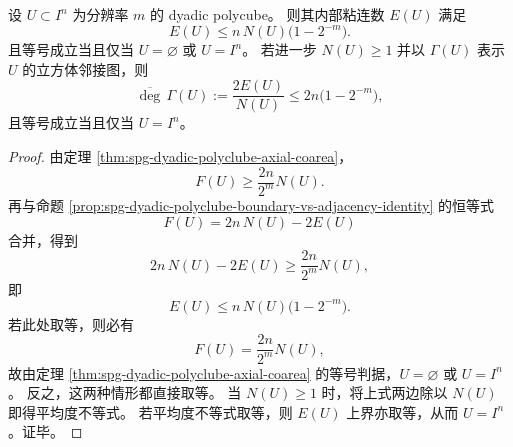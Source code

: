 \begin{theorem}[内部粘连数的最优上界与极值唯一性]\label{thm:spg-polyclube-adhesion-sharp-upper-bound}
设 \(U\subset I^n\) 为分辨率 \(m\) 的 dyadic polycube。
则其内部粘连数 \(E(U)\) 满足
\[
E(U)\le n\,N(U)\bigl(1-2^{-m}\bigr).
\]
且等号成立当且仅当 \(U=\varnothing\) 或 \(U=I^n\)。
若进一步 \(N(U)\ge 1\) 并以 \(\Gamma(U)\) 表示 \(U\) 的立方体邻接图，则
\[
\overline{\deg}\,\Gamma(U):=\frac{2E(U)}{N(U)}
\le
2n\bigl(1-2^{-m}\bigr),
\]
且等号成立当且仅当 \(U=I^n\)。
\end{theorem}
\begin{proof}
由定理 \ref{thm:spg-dyadic-polyclube-axial-coarea}，
\[
F(U)\ge \frac{2n}{2^m}N(U).
\]
再与命题 \ref{prop:spg-dyadic-polyclube-boundary-vs-adjacency-identity} 的恒等式
\[
F(U)=2n\,N(U)-2E(U)
\]
合并，得到
\[
2n\,N(U)-2E(U)\ge \frac{2n}{2^m}N(U),
\]
即
\[
E(U)\le n\,N(U)\bigl(1-2^{-m}\bigr).
\]
若此处取等，则必有
\[
F(U)=\frac{2n}{2^m}N(U),
\]
故由定理 \ref{thm:spg-dyadic-polyclube-axial-coarea} 的等号判据，\(U=\varnothing\) 或 \(U=I^n\)。
反之，这两种情形都直接取等。
当 \(N(U)\ge 1\) 时，将上式两边除以 \(N(U)\) 即得平均度不等式。
若平均度不等式取等，则 \(E(U)\) 上界亦取等，从而 \(U=I^n\)。证毕。
\end{proof}


